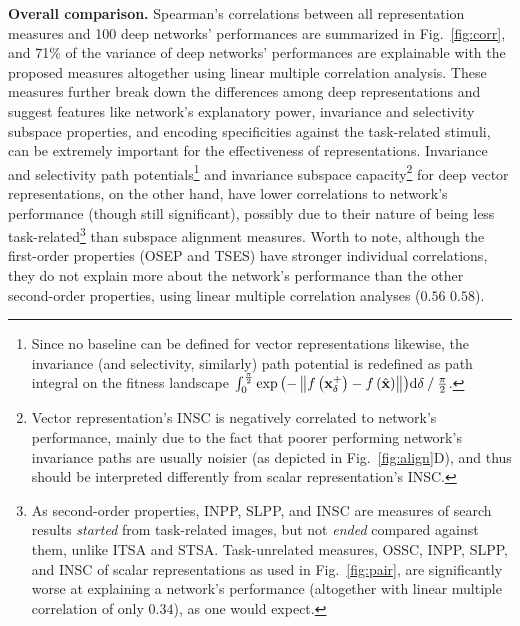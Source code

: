 \documentclass[10pt,twocolumn,letterpaper]{article}
\begin{document}

\newcommand{\defvecpp}{Since no baseline can be defined for vector representations likewise, the invariance (and selectivity, similarly) path potential is redefined as path integral on the fitness landscape $\int_{0}^{\frac{\pi}{2}}{\exp\left(-\left\|f\left(\bf{x}^{+}_{\delta}\right)-f\left(\hat{\bf{x}}\right)\right\|\right)}\mathrm{d}\delta \mathbin{/} {\frac{\pi}{2}}$.}

\newcommand{\expinsc}{Vector representation's INSC is negatively correlated to network's performance, mainly due to the fact that poorer performing network's invariance paths are usually noisier (as depicted in Fig.~\ref{fig:align}D), and thus should be interpreted differently from scalar representation's INSC.}

\newcommand{\expextrinsic}{As second-order properties, INPP, SLPP, and INSC are measures of search results \emph{started} from task-related images, but not \emph{ended} compared against them, unlike ITSA and STSA.
Task-unrelated measures, \ie OSSC, INPP, SLPP, and INSC of scalar representations as used in Fig.~\ref{fig:pair}, are significantly worse at explaining a network's performance (altogether with linear multiple correlation of only $0.34$), as one would expect.
}

{\bf Overall comparison.} Spearman's correlations between all representation measures and 100 deep networks' performances are summarized in Fig.~\ref{fig:corr}, and 71\% of the variance of deep networks' performances are explainable with the proposed measures altogether using linear multiple correlation analysis.
These measures further break down the differences among deep representations and suggest features like network's explanatory power, invariance and selectivity subspace properties, and encoding specificities against the task-related stimuli, can be extremely important for the effectiveness of representations.
Invariance and selectivity path potentials\footnote{\defvecpp} and invariance subspace capacity\footnote{\expinsc} for deep vector representations, on the other hand, have lower correlations to network's performance (though still significant), possibly due to their nature of being less task-related\footnote{\expextrinsic} than subspace alignment measures.
Worth to note, although the first-order properties (OSEP and TSES) have stronger individual correlations, they do not explain more about the network's performance than the other second-order properties, using linear multiple correlation analyses ($0.56$ \vs $0.58$).
\end{document}
